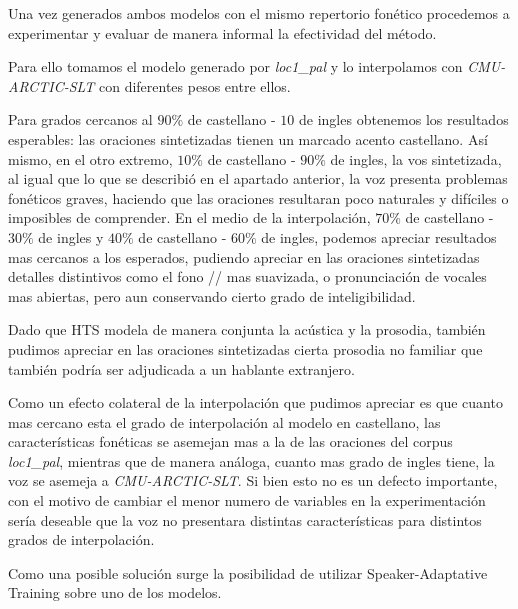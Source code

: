 Una vez generados ambos modelos con el mismo repertorio fonético procedemos a experimentar y evaluar de manera informal la efectividad del método.

Para ello tomamos el modelo generado por \textit{loc1\_pal} y lo interpolamos con \textit{CMU-ARCTIC-SLT} con diferentes pesos entre ellos.

Para grados cercanos al $90\%$ de castellano - $10$ de ingles obtenemos los resultados esperables: las oraciones sintetizadas tienen un marcado acento castellano. Así mismo, en el otro extremo, $10\%$ de castellano - $90\%$ de ingles, la vos sintetizada, al igual que lo que se describió en el apartado anterior, la voz presenta problemas fonéticos graves, haciendo que las oraciones resultaran poco naturales y difíciles o imposibles de comprender. En el medio de la interpolación, $70\%$ de castellano - $30\%$ de ingles y $40\%$ de castellano - $60\%$ de ingles, podemos apreciar resultados mas cercanos a los esperados, pudiendo apreciar en las oraciones sintetizadas detalles distintivos como el fono // mas suavizada, o pronunciación de vocales mas abiertas, pero aun conservando cierto grado de inteligibilidad.

Dado que HTS modela de manera conjunta la acústica y la prosodia, también pudimos apreciar en las oraciones sintetizadas cierta prosodia no familiar que también podría ser adjudicada a un hablante extranjero.  

Como un efecto colateral de la interpolación que pudimos apreciar es que cuanto mas cercano esta el grado de interpolación al modelo en castellano, las características fonéticas se asemejan mas a la de las oraciones del corpus \textit{loc1\_pal}, mientras que de manera análoga, cuanto mas grado de ingles tiene, la voz se asemeja a \textit{CMU-ARCTIC-SLT}. Si bien esto no es un defecto importante, con el motivo de cambiar el menor numero de variables en la experimentación sería deseable que la voz no presentara distintas características para distintos grados de interpolación.

Como una posible solución surge la posibilidad de utilizar Speaker-Adaptative Training sobre uno de los modelos.